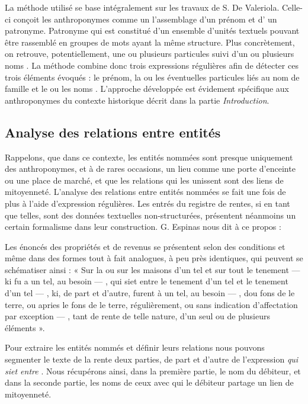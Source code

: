 La méthode utilisé se base intégralement sur les travaux de S. De Valeriola. Celle-ci conçoit les anthroponymes comme un l'assemblage d'un  prénom et d' un patronyme. Patronyme qui est constitué d'un ensemble d'unités textuels  pouvant être rassemblé en  groupes de mots ayant la même structure. Plus concrètement, on retrouve, potentiellement,  une ou plusieurs particules  suivi d'un ou plusieurs \og noms \fg{}. La méthode combine donc trois expressions régulières afin de détecter ces trois éléments évoqués : le prénom, la ou les éventuelles particules liés au nom de famille et le ou les noms \parencite{de_valeriola_lordinateur_2021}. L'approche développée est évidement spécifique aux anthroponymes du contexte historique décrit dans la partie \textit{Introduction}.


\subsection{Analyse des relations entre entités}
Rappelons, que dans ce contexte, les entités nommées sont presque uniquement des anthroponymes, et à de rares occasions, un lieu comme une porte d'enceinte ou une place de marché, et que les relations qui les unissent sont des liens de mitoyenneté.
L'analyse des relations entre entités nommées se fait une fois de plus à l'aide d'expression régulières. Les entrés du registre de rentes, si en tant que telles, sont des données textuelles non-structurées, présentent néanmoins un certain formalisme dans leur construction. G. Espinas nous dit à ce propos : 
\begin{displayquote}
    \og Les énoncés des propriétés et de revenus se présentent selon des conditions et même dans des formes tout à fait analogues, à peu près identiques, qui peuvent se schématiser ainsi : « Sur la ou sur les maisons d’un tel et sur tout le tenement — ki fu a un tel, au besoin — , qui siet entre le tenement d’un tel et le tenement d’un tel — , ki, de part et d’autre, furent à un tel, au besoin — , dou fons de le terre, ou apries le fons de le terre, régulièrement, ou sans indication d’affectation par exception — , tant de rente de telle nature, d’un seul ou de plusieurs éléments ».\fg{}
\end{displayquote} 
\vspace{0,5cm}
Pour extraire les entités nommés et définir leurs relations nous pouvons segmenter le texte de la rente deux parties, de part et d'autre de l'expression \og \textit{qui siet entre} \fg{}. Nous récupérons ainsi, dans la première partie, le nom du débiteur, et dans la seconde partie, les noms de ceux avec qui le débiteur partage un lien de mitoyenneté.



